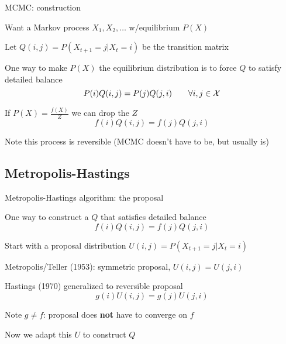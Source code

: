\documentclass{beamer}
\begin{document}
\begin{frame}{MCMC: construction}

\itemb
\item Want a Markov process $X_1, X_2, \ldots$ w/equilibrium $P(X)$
\item Let $Q(i,j) = P(X_{t+1}=j | X_t = i)$  be the \alert{transition matrix}
\item One way to make $P(X)$ the equilibrium distribution is to force $Q$ to satisfy \alert{detailed balance}
\[
P(i) Q(i,j) = P(j) Q(j,i) \quad \quad \forall i,j \in {\cal X}
\]
\item If $P(X) = \frac{f(X)}{Z}$ we can drop the $Z$
\[
f(i) Q(i,j) = f(j) Q(j,i)
\]
\item Note this process is \alert{reversible} (MCMC doesn't have to be, but usually is)
\iteme

\end{frame}

\subsection{Metropolis-Hastings}

\begin{frame}{Metropolis-Hastings algorithm: the proposal}

\itemb
\item One way to construct a $Q$ that satisfies detailed balance
\[
f(i) Q(i,j) = f(j) Q(j,i)
\]
\item Start with a \alert{proposal distribution} $U(i,j) = P(X_{t+1}=j|X_t=i)$
 \itemb
 \item Metropolis/Teller (1953): \alert{symmetric} proposal, $U(i,j)=U(j,i)$
 \item Hastings (1970) generalized to \alert{reversible} proposal
\[
g(i)U(i,j)=g(j)U(j,i)
\]
 \item Note $g \neq f$: proposal does {\bf not} have to converge on $f$
 \iteme
\item Now we adapt this $U$ to construct $Q$
\iteme

\end{frame}
\end{document}
